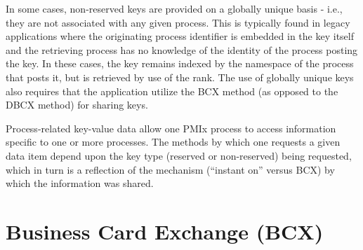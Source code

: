 In some cases, non-reserved keys are provided on a globally unique basis -
i.e., they are not associated with any given process. This is typically found
in legacy applications where the originating process identifier is embedded in
the key itself and the retrieving process has no knowledge of the identity of
the process posting the key. In these cases, the key remains indexed by the
namespace of the process that posts it, but is retrieved by use of the
 rank. The use of globally unique keys also requires
that the application utilize the \ac{BCX} method (as opposed to the
\ac{DBCX} method) for sharing keys.

Process-related key-value data allow one \ac{PMIx} process to access information specific to one or more processes. The methods by which one requests a given data item depend upon the key type (reserved or non-reserved) being requested, which in turn is a reflection of the mechanism (``instant on'' versus \ac{BCX}) by which the information was shared.

\section{Business Card Exchange (BCX)}

